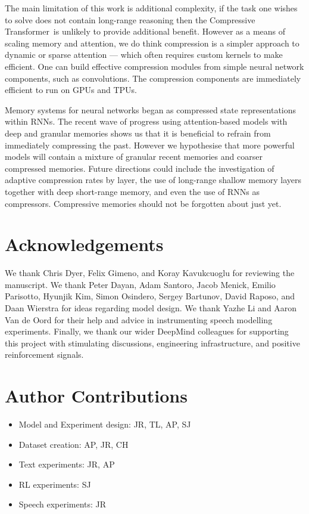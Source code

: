 \documentclass{article} \usepackage{iclr2020_conference,times}
\newcommand{\model}{Compressive Transformer}
\begin{document}
The main limitation of this work is additional complexity, if the task one wishes to solve does not contain long-range reasoning then the \model~is unlikely to provide additional benefit. However as a means of scaling memory and attention, we do think compression is a simpler approach to dynamic or sparse attention --- which often requires custom kernels to make efficient. One can build effective compression modules from simple neural network components, such as convolutions. The compression components are immediately efficient to run on GPUs and TPUs.

Memory systems for neural networks began as compressed state representations within RNNs. The recent wave of progress using attention-based models with deep and granular memories shows us that it is beneficial to refrain from immediately compressing the past. However we hypothesise that more powerful models will contain a mixture of granular recent memories and coarser compressed memories. Future directions could include the investigation of adaptive compression rates by layer, the use of long-range shallow memory layers together with deep short-range memory, and even the use of RNNs as compressors. Compressive memories should not be forgotten about just yet.

\ificlrfinal
\section*{Acknowledgements}
We thank Chris Dyer, Felix Gimeno, and Koray Kavukcuoglu for reviewing the manuscript. We thank Peter Dayan, Adam Santoro, Jacob Menick, Emilio Parisotto, Hyunjik Kim, Simon Osindero, Sergey Bartunov, David Raposo, and Daan Wierstra for ideas regarding model design. We thank Yazhe Li and Aaron Van de Oord for their help and advice in instrumenting speech modelling experiments. Finally, we thank our wider DeepMind colleagues for supporting this project with stimulating discussions, engineering infrastructure, and positive reinforcement signals.  

\section*{Author Contributions}
\begin{itemize}
\item[] Model and Experiment design: JR, TL, AP, SJ
\item[] Dataset creation: AP, JR, CH
\item[] Text experiments: JR, AP
\item[] RL experiments: SJ
\item[] Speech experiments: JR
\end{itemize}
\end{document}
